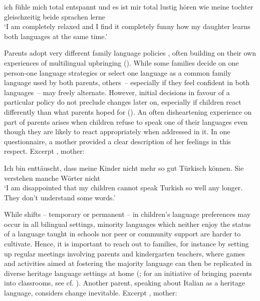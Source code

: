 \documentclass[output=paper,colorlinks,citecolor=brown]{langscibook}
\begin{document}
\ea \label{ex:04:1}
ich fühle mich total entspannt und es ist mir total lustig hören wie meine tochter gleischzeitig beide sprachen lerne\\
\trans`I am completely relaxed and I find it completely funny how my daughter learns both languages at the same time.'
\z

\begin{sloppypar}
Parents adopt very different family language policies \citep{Romaine1989, Gawlitzek-Maiwald&Tracy1996, Lanza2004, DeHouwer2007, Tracy2008, Mueller&al.2018}, often building on their own experiences of multilingual upbringing (\cite{Purkarthofer&Steien2019}). While some families decide on one person-one language strategies or select one language as a common family language used by both parents, others~– especially if they feel confident in both languages~– may freely alternate. However, initial decisions in favour of a particular policy do not preclude changes later on, especially if children react differently than what parents hoped for (\cite{Gawlitzek-Maiwald&Tracy1996}). An often disheartening experience on part of parents arises when children refuse to speak one of their languages even though they are likely to react appropriately when addressed in it.
In one questionnaire, a mother provided a clear description of her feelings in this respect.
Excerpt , mother:
\end{sloppypar}

\ea \label{ex:04:2}
Ich bin enttäuscht, dass meine Kinder nicht mehr so gut Türkisch können. Sie verstehen manche Wörter nicht\\
\trans `I am disappointed that my children cannot speak Turkish so well any longer. They don’t understand some words.'
\z

While shifts – temporary or permanent – in children’s language preferences may occur in all bilingual settings, minority languages which neither enjoy the status of a language taught in schools nor peer or community support are harder to cultivate. Hence, it is important to reach out to families, for instance by setting up regular meetings involving parents and kindergarten teachers, where games and activities aimed at fostering the majority language can then be replicated in diverse heritage language settings at home (\cite{Tracy&al.2009}; for an initiative of bringing parents into classrooms, see cf. \cite{Prasad2017}).
Another parent, speaking about Italian as a heritage language, considers change inevitable.
Excerpt , mother:\largerpage
\end{document}
